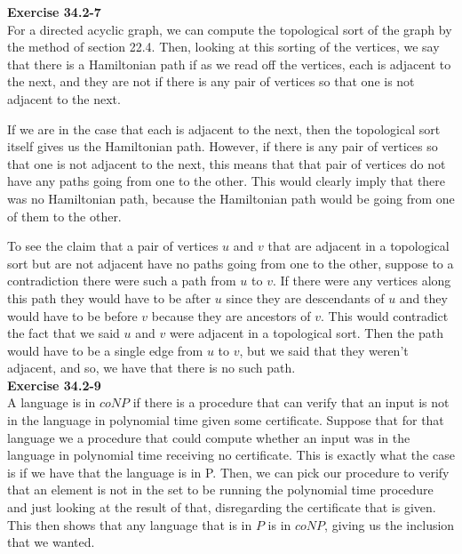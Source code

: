 \documentclass{article}
\begin{document}
\noindent\textbf{Exercise 34.2-7}\\

For a directed acyclic graph, we can compute the topological sort of the graph by the method of section 22.4. Then, looking at this sorting of the vertices, we say that there is a Hamiltonian path if as we read off the vertices, each is adjacent to the next, and they are not if there is any pair of vertices so that one is not adjacent to the next.

If we are in the case that each is adjacent to the next, then the topological sort itself gives us the Hamiltonian path. However, if there is any pair of vertices so that one is not adjacent to the next, this means that that pair of vertices do not have any paths going from one to the other. This would clearly imply that there was no Hamiltonian path, because the Hamiltonian path would be going from one of them to the other.

To see the claim that a pair of vertices $u$ and $v$ that are adjacent in a topological sort but are not adjacent have no paths going from one to the other, suppose to a contradiction there were such a path from $u$ to $v$. If there were any vertices along this path they would have to be after $u$ since they are descendants of $u$ and they would have to be before $v$ because they are ancestors of $v$. This would contradict the fact that we said $u$ and $v$ were adjacent in a topological sort. Then the path would have to be a single edge from $u$ to $v$, but we said that they weren't adjacent, and so, we have that there is no such path.\\



\noindent\textbf{Exercise 34.2-9}\\

A language is in $coNP$ if there is a procedure that can verify that an input is not in the language in polynomial time given some certificate. Suppose that for that language we a procedure that could compute whether an input was in the language in polynomial time receiving no certificate. This is exactly what the case is if we have that the language is in P. Then, we can pick our procedure to verify that an element is not in the set to be running the polynomial time procedure and just looking at the result of that, disregarding the certificate that is given. This then shows that any language that is in $P$ is in $coNP$, giving us the inclusion that we wanted.\\
\end{document}
